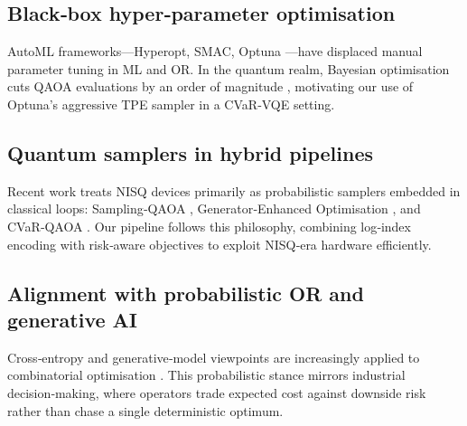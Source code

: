 \subsection{Black‑box hyper‑parameter optimisation}
AutoML frameworks—Hyperopt, SMAC, Optuna \cite{akiba_optuna_2019}—have
displaced manual parameter tuning in ML and OR.  In the quantum realm,
Bayesian optimisation cuts QAOA evaluations by an order of magnitude
\cite{tibaldi_bayes_qaoa_2023}, motivating our use of Optuna’s aggressive
TPE sampler in a CVaR‑VQE setting.

\subsection{Quantum samplers in hybrid pipelines}
Recent work treats NISQ devices primarily as probabilistic samplers
embedded in classical loops: Sampling‑QAOA \cite{matsuyama2025},
Generator‑Enhanced Optimisation \cite{albarran2024}, and CVaR‑QAOA
\cite{barkoutsos_improving_2020}.  Our pipeline follows this philosophy,
combining log‑index encoding with risk‑aware objectives to exploit
NISQ‑era hardware efficiently.

\subsection{Alignment with probabilistic OR and generative AI}
Cross‑entropy and generative‑model viewpoints are increasingly applied to
combinatorial optimisation \cite{caramanis2023}.  This probabilistic
stance mirrors industrial decision‑making, where operators trade
expected cost against downside risk rather than chase a single
deterministic optimum.
